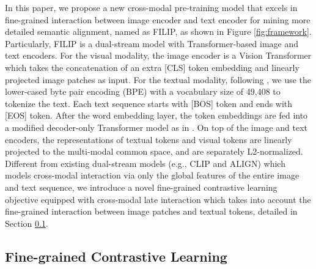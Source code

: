 In this paper, we propose a new cross-modal pre-training model that excels in fine-grained interaction between image encoder and text encoder for mining more detailed semantic alignment, named as FILIP, as shown in  Figure \ref{fig:framework}. 
Particularly, FILIP is a dual-stream model with Transformer-based image and text encoders.
For the visual modality, the image encoder is a Vision Transformer \citep{dosovitskiy2020image} which takes the concatenation of an extra [CLS] token embedding and linearly projected image patches as input.
For the textual modality, following \cite{radford2021learning}, we use the lower-cased byte pair encoding (BPE) \citep{sennrich2016neural}
with a vocabulary size of 49,408  to tokenize the text. 
Each text sequence starts with [BOS] token and ends with [EOS] token.
After the word embedding layer, the token embeddings are fed into a modified decoder-only Transformer model as in \citep{radford2019language}. 
On top of the image and text encoders, the representations of textual tokens and visual tokens are linearly projected to the multi-modal common space, and are separately L2-normalized. 
Different from existing dual-stream models (e.g., CLIP and ALIGN) which models cross-modal interaction via only the global features of the entire image and text sequence, 
we introduce a novel fine-grained contrastive learning objective equipped with cross-modal late interaction which takes into account the fine-grained interaction between image patches and textual tokens, detailed in Section \ref{sec:late_interaction}.




\vspace{-1mm}
\subsection{Fine-grained Contrastive Learning}
\label{sec:late_interaction}

